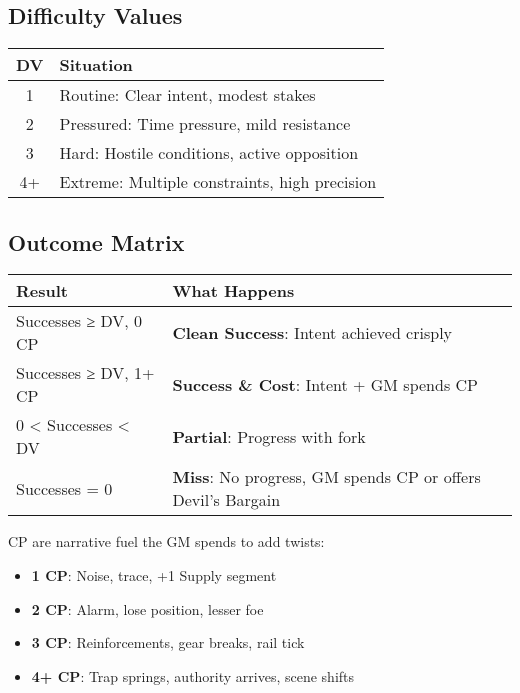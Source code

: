 \documentclass[11pt]{article}
\begin{document}
\subsection{Difficulty Values}
\begin{center}
\begin{tabular}{cl}
\toprule
\textbf{DV} & \textbf{Situation} \\
\midrule
1 & Routine: Clear intent, modest stakes \\
2 & Pressured: Time pressure, mild resistance \\
3 & Hard: Hostile conditions, active opposition \\
4+ & Extreme: Multiple constraints, high precision \\
\bottomrule
\end{tabular}
\end{center}

\subsection{Outcome Matrix}
\begin{center}
\begin{tabular}{ll}
\toprule
\textbf{Result} & \textbf{What Happens} \\
\midrule
Successes ≥ DV, 0 CP & \textbf{Clean Success}: Intent achieved crisply \\
Successes ≥ DV, 1+ CP & \textbf{Success \& Cost}: Intent + GM spends CP \\
0 < Successes < DV & \textbf{Partial}: Progress with fork \\
Successes = 0 & \textbf{Miss}: No progress, GM spends CP or offers Devil's Bargain \\
\bottomrule
\end{tabular}
\end{center}

\begin{fatebox}
CP are narrative fuel the GM spends to add twists:
\begin{itemize}
    \item \textbf{1 CP}: Noise, trace, +1 Supply segment
    \item \textbf{2 CP}: Alarm, lose position, lesser foe
    \item \textbf{3 CP}: Reinforcements, gear breaks, rail tick
    \item \textbf{4+ CP}: Trap springs, authority arrives, scene shifts
\end{itemize}
\end{fatebox}
\end{document}
